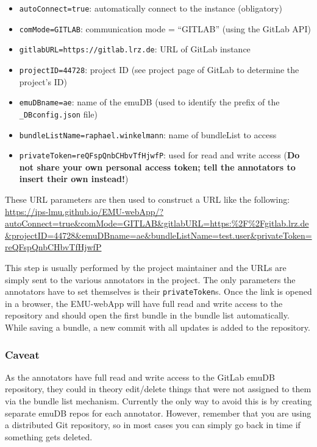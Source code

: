 \documentclass[
]{book}
\providecommand{\tightlist}{%
  \setlength{\itemsep}{0pt}\setlength{\parskip}{0pt}}
\begin{document}
\begin{itemize}
\tightlist
\item
  \texttt{autoConnect=true}: automatically connect to the instance (obligatory)
\item
  \texttt{comMode=GITLAB}: communication mode = ``GITLAB'' (using the GitLab API)
\item
  \texttt{gitlabURL=https://gitlab.lrz.de}: URL of GitLab instance
\item
  \texttt{projectID=44728}: project ID (see project page of GitLab to determine the project's ID)
\item
  \texttt{emuDBname=ae}: name of the emuDB (used to identify the prefix of the \texttt{\_DBconfig.json} file)
\item
  \texttt{bundleListName=raphael.winkelmann}: name of bundleList to access
\item
  \texttt{privateToken=reQFspQnbCHbvTfHjwfP}: used for read and write access (\textbf{Do not share your own personal access token; tell the annotators to insert their own instead!})
\end{itemize}

These URL parameters are then used to construct a URL like the following: \url{https://ips-lmu.github.io/EMU-webApp/?autoConnect=true\&comMode=GITLAB\&gitlabURL=https:\%2F\%2Fgitlab.lrz.de\&projectID=44728\&emuDBname=ae\&bundleListName=test.user\&privateToken=reQFspQnbCHbvTfHjwfP}

This step is usually performed by the project maintainer and the URLs are simply sent to the various annotators in the project. The only parameters the annotators have to set themselves is their \texttt{privateToken}s. Once the link is opened in a browser, the EMU-webApp will have full read and write access to the repository and should open the first bundle in the bundle list automatically. While saving a bundle, a new commit with all updates is added to the repository.

\hypertarget{caveat}{%
\subsubsection{Caveat}\label{caveat}}

As the annotators have full read and write access to the GitLab emuDB repository, they could in theory edit/delete things that were not assigned to them via the bundle list mechanism. Currently the only way to avoid this is by creating separate emuDB repos for each annotator. However, remember that you are using a distributed Git repository, so in most cases you can simply go back in time if something gets deleted.
\end{document}
